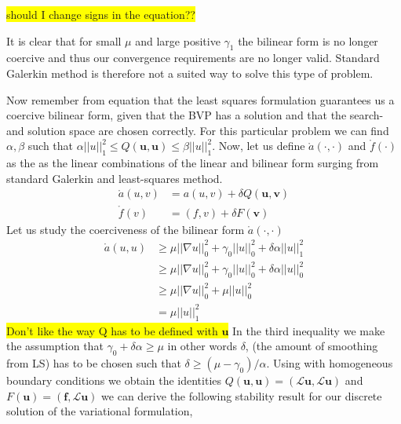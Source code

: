 \colorbox{yellow}{should I change signs in the equation?? } 


It is clear that for small $\mu$ and large positive $\gamma_1$ the bilinear form is no longer coercive and thus our convergence requirements are no longer valid. Standard Galerkin method is therefore not a suited way to solve this type of problem. 

Now remember from equation  that the least squares formulation guarantees us a coercive bilinear form, given that the BVP has a solution and that the search- and solution space are chosen correctly. For this particular problem we can find $\alpha,\beta$ such that $\alpha||u||_1^2 \leq Q(\mathbf{u},\mathbf{u}) \leq \beta||u||_1^2 $.
Now, let us define $\mathring{a}(\cdot,\cdot)$ and $\mathring{f}(\cdot)$ as the as the linear combinations of the linear and bilinear form surging from standard Galerkin and least-squares method. 
\begin{align}
	\mathring{a}(u,v) &= a(u,v) + \delta Q(\mathbf{u},\mathbf{\mathbf{v}}) \\
	 \mathring{f}(v) &= (f,v) + \delta F(\mathbf{\mathbf{v}}) 
	\label{eq:GLS}
\end{align}
Let us study the coerciveness of the bilinear form $\mathring{a}(\cdot,\cdot)$
\begin{align}
	\mathring{a}(u,u) &\geq \mu ||\nabla u||_0^2+\gamma_0||u||_0^2+\delta \alpha ||u||^2_1 \\
	&\geq \mu ||\nabla u||_0^2+\gamma_0||u||_0^2+\delta \alpha ||u||^2_0 \\
	&\geq \mu ||\nabla u||_0^2+\mu ||u||_0^2 \\
	&= \mu ||u||^2_1
	\label{eq:coercivity}
\end{align}
\colorbox{yellow}{Don't like the way Q has to be defined with $\mathbf{u}$}
In the third inequality we make the assumption that $\gamma_0+\delta \alpha \geq \mu $ in other words $\delta$, (the amount of smoothing from LS) has to be chosen such that $\delta \geq (\mu-\gamma_0)/\alpha$.
Using  with homogeneous boundary conditions we obtain the identities $Q(\mathbf{u},\mathbf{u}) = (\mathcal{L}\mathbf{u},\mathcal{L}\mathbf{u})$ and $F(\mathbf{u}) = (\mathbf{f},\mathcal{L}\mathbf{u})$ we can derive the following stability result for our discrete solution of the variational formulation, 
	
